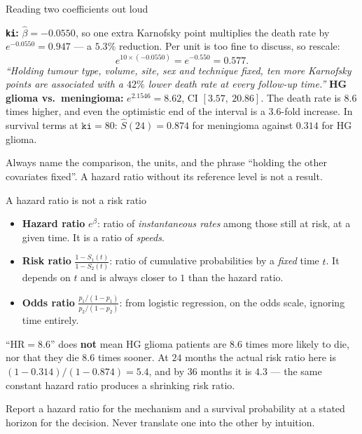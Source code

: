 \documentclass[aspectratio=169,11pt]{beamer}
\begin{document}
\begin{frame}{Reading two coefficients out loud}
  \footnotesize
  \begin{numexample}
    \textbf{\texttt{ki}:} $\hat\beta=-0.0550$, so one extra Karnofsky point multiplies the
    death rate by $e^{-0.0550}=0.947$ --- a $5.3\%$ reduction. Per unit is too fine to
    discuss, so rescale:
    \[
      e^{10\times(-0.0550)}=e^{-0.550}=0.577 .
    \]
    \emph{``Holding tumour type, volume, site, sex and technique fixed, ten more Karnofsky
    points are associated with a $42\%$ lower death rate at every follow-up time.''}
    \medskip
    \textbf{HG glioma vs.\ meningioma:} $e^{2.1546}=8.62$, CI $[3.57,\ 20.86]$. The death
    rate is $8.6$ times higher, and even the optimistic end of the interval is a
    $3.6$-fold increase. In survival terms at $\texttt{ki}=80$: $\hat S(24)=0.874$ for
    meningioma against $0.314$ for HG glioma.
  \end{numexample}
  \begin{takeaway}
    Always name the comparison, the units, and the phrase ``holding the other
    covariates fixed''. A hazard ratio without its reference level is not a result.
  \end{takeaway}
\end{frame}

\begin{frame}{A hazard ratio is not a risk ratio}
  \begin{mistake}
    \begin{itemize}
      \item \textbf{Hazard ratio} $e^{\beta}$: ratio of \emph{instantaneous rates} among
            those still at risk, at a given time. It is a ratio of \emph{speeds}.
      \item \textbf{Risk ratio} $\frac{1-S_1(t)}{1-S_2(t)}$: ratio of cumulative
            probabilities by a \emph{fixed} time $t$. It depends on $t$ and is always
            closer to $1$ than the hazard ratio.
      \item \textbf{Odds ratio} $\frac{p_1/(1-p_1)}{p_2/(1-p_2)}$: from logistic
            regression, on the odds scale, ignoring time entirely.
    \end{itemize}
    ``$\mathrm{HR}=8.6$'' does \textbf{not} mean HG glioma patients are $8.6$ times more
    likely to die, nor that they die $8.6$ times sooner. At $24$ months the actual risk
    ratio here is $(1-0.314)/(1-0.874)=5.4$, and by $36$ months it is $4.3$ --- the same
    constant hazard ratio produces a shrinking risk ratio.
  \end{mistake}
  \begin{takeaway}
    Report a hazard ratio for the mechanism and a survival probability at a stated
    horizon for the decision. Never translate one into the other by intuition.
  \end{takeaway}
\end{frame}
\end{document}
